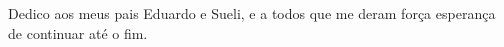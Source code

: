 \begin{dedicatoria}
\vspace*{\fill}
Dedico aos meus pais Eduardo e Sueli, e a todos que me deram força esperança de continuar até o fim.
\vspace*{\fill}
\end{dedicatoria}